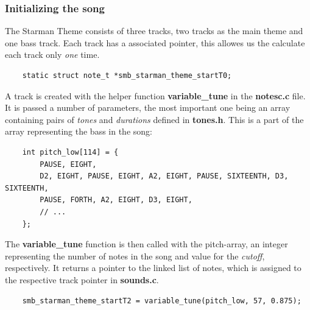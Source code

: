 \subsubsection{Initializing the song}
The Starman Theme consists of three tracks, two tracks as the main theme and one bass track.
Each track has a associated pointer, this allowes us the calculate each track only
\textit{one} time.
\begin{lstlisting}
	static struct note_t *smb_starman_theme_startT0;
\end{lstlisting}
A track is created with the helper function \textbf{variable\_tune} in the \textbf{notesc.c} file.
It is passed a number of parameters, the most important one being an array containing pairs
of \textit{tones} and \textit{durations} defined in \textbf{tones.h}. This is a part of the array
representing the bass in the song:
\begin{lstlisting}
	int pitch_low[114] = {
		PAUSE, EIGHT,
		D2, EIGHT, PAUSE, EIGHT, A2, EIGHT, PAUSE, SIXTEENTH, D3, SIXTEENTH,
		PAUSE, FORTH, A2, EIGHT, D3, EIGHT,
		// ...
	};
\end{lstlisting}
The \textbf{variable\_tune} function is then called with the pitch-array, an integer representing
the number of notes in the song and value for the \textit{cutoff}, respectively. It returns a pointer to the linked list of notes, which is assigned to the respective track pointer in
\textbf{sounds.c}.
\begin{lstlisting}
	smb_starman_theme_startT2 = variable_tune(pitch_low, 57, 0.875);
\end{lstlisting}
